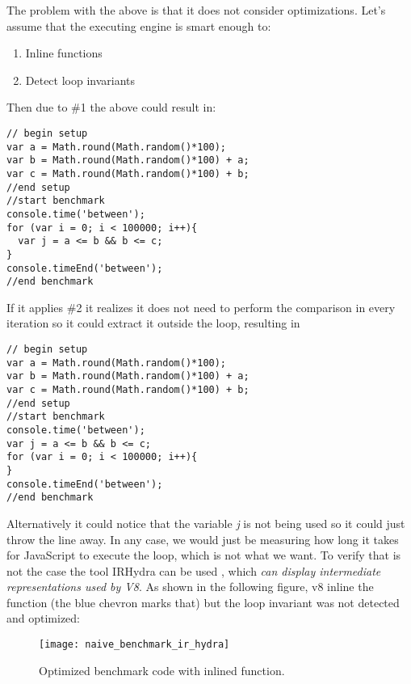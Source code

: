 The problem with the above is that it does not consider optimizations. Let's assume that the executing engine is smart enough to:
\begin{enumerate}
  \item Inline functions
  \item Detect loop invariants
\end{enumerate}

Then due to \#1 the above could result in:
\begin{lstlisting}[caption=Naive benchmark after inlining]
// begin setup
var a = Math.round(Math.random()*100);
var b = Math.round(Math.random()*100) + a;
var c = Math.round(Math.random()*100) + b;
//end setup
//start benchmark
console.time('between');
for (var i = 0; i < 100000; i++){
  var j = a <= b && b <= c;
}
console.timeEnd('between');
//end benchmark
\end{lstlisting}

If it applies \#2 it realizes it does not need to perform the comparison in every iteration so it could extract it outside the loop, resulting in
\begin{lstlisting}[caption=Naive benchmark after evaluating loop invariants]
// begin setup
var a = Math.round(Math.random()*100);
var b = Math.round(Math.random()*100) + a;
var c = Math.round(Math.random()*100) + b;
//end setup
//start benchmark
console.time('between');
var j = a <= b && b <= c;
for (var i = 0; i < 100000; i++){
}
console.timeEnd('between');
//end benchmark
\end{lstlisting}

Alternatively it could notice that the variable \textit{j} is not being used so it could just throw the line away. In any case, we would just be measuring how long it takes for JavaScript to execute the loop, which is not what we want. To verify that is not the case the tool IRHydra can be used \cite{ir-hydra}, which \textit{can display intermediate representations used by V8}. As shown in the following figure, v8 inline the function (the blue chevron marks that) but the loop invariant was not detected and optimized:
\begin{figure}[h!]
  \centering
  \texttt{[image: naive\_benchmark\_ir\_hydra]}
  \caption{Optimized benchmark code with inlined function.}
\end{figure}
\pagebreak